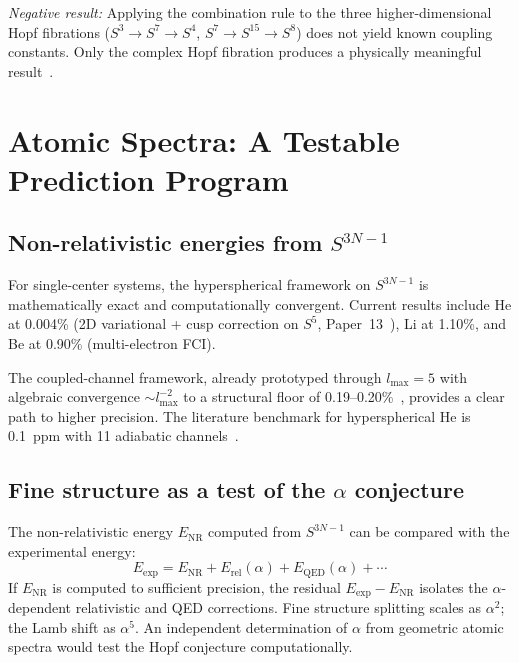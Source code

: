 \documentclass[aps,pra,twocolumn,superscriptaddress,longbibliography]{revtex4-2}
\begin{document}
\textit{Negative result:} Applying the combination rule to the three
higher-dimensional Hopf fibrations ($S^3 \to S^7 \to S^4$,
$S^7 \to S^{15} \to S^8$) does not yield known coupling constants.
Only the complex Hopf fibration produces a physically meaningful
result~\cite{Paper2}.


\section{Atomic Spectra: A Testable Prediction Program}
\label{sec:spectra}

\subsection{Non-relativistic energies from $S^{3N-1}$}

For single-center systems, the hyperspherical framework on $S^{3N-1}$
is mathematically exact and computationally convergent.  Current
results include He at 0.004\% (2D variational + cusp correction on $S^5$,
Paper~13~\cite{Paper13}), Li at 1.10\%, and Be at 0.90\%
(multi-electron FCI).

The coupled-channel framework, already prototyped through $l_{\max} = 5$
with algebraic convergence $\sim l_{\max}^{-2}$ to a structural floor
of 0.19--0.20\%~\cite{Paper13}, provides a clear path to higher
precision.  The literature benchmark for hyperspherical He is 0.1~ppm
with 11 adiabatic channels~\cite{Lin1995}.

\subsection{Fine structure as a test of the $\alpha$ conjecture}

The non-relativistic energy $E_{\text{NR}}$ computed from $S^{3N-1}$ can
be compared with the experimental energy:
\begin{equation}
E_{\text{exp}} = E_{\text{NR}} + E_{\text{rel}}(\alpha)
+ E_{\text{QED}}(\alpha) + \cdots
\label{eq:energy_decomposition}
\end{equation}
If $E_{\text{NR}}$ is computed to sufficient precision, the residual
$E_{\text{exp}} - E_{\text{NR}}$ isolates the $\alpha$-dependent
relativistic and QED corrections.  Fine structure splitting scales as
$\alpha^2$; the Lamb shift as $\alpha^5$.  An independent determination
of $\alpha$ from geometric atomic spectra would test the Hopf conjecture
computationally.
\end{document}
